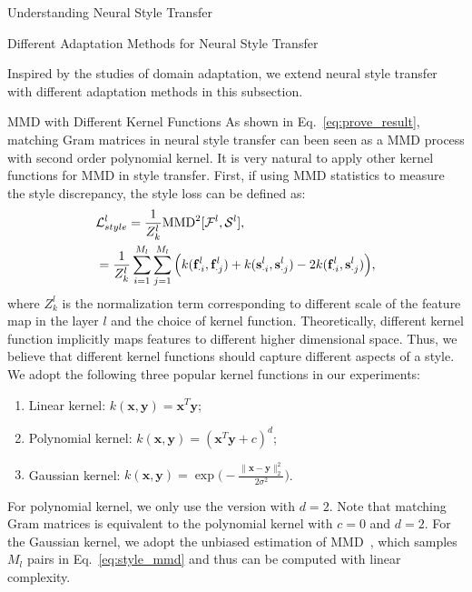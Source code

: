 \begin{section}{Understanding Neural Style Transfer}
\begin{subsection}{Different Adaptation Methods for Neural Style Transfer}

Inspired by the studies of domain adaptation, we extend neural style transfer with different adaptation methods in this subsection.

\begin{paragraph}{MMD with Different Kernel Functions}
As shown in Eq.~\ref{eq:prove_result}, matching Gram matrices in neural style transfer can been seen as a MMD process with second order polynomial kernel. It is very natural to apply other kernel functions for MMD in style transfer. First, if using MMD statistics to measure the style discrepancy, the style loss can be defined as:
\begin{equation}\label{eq:style_mmd}
\begin{aligned}
&\mathcal{L}_{style}^l = \frac{1}{Z^l_k}\text{MMD}^2[\mathcal{F}^{l}, \mathcal{S}^{l}],\\
	&= \frac{1}{Z^l_k}\sum_{i=1}^{M_l}\sum_{j=1}^{M_l}\Big( 
		k(\col{\mathbf{f}^l}{i}, \col{\mathbf{f}^l}{j}) +
		  k(\col{\mathbf{s}^l}{i}, \col{\mathbf{s}^l}{j}) - 2k(\col{\mathbf{f}^l}{i}, \col{\mathbf{s}^l}{j})
	\Big),
\end{aligned}
\end{equation}
where $Z^l_k$ is the normalization term corresponding to different scale of the feature map in the layer $l$ and the choice of  kernel function. Theoretically, different kernel function implicitly maps features to different higher dimensional space. Thus, we believe that different kernel functions should capture different aspects of a style. We adopt the following three popular kernel functions in our experiments:
\begin{enumerate}[{(1)}]
	\item Linear kernel: $k(\mathbf{x}, \mathbf{y}) = \mathbf{x}^T\mathbf{y}$;
	\item Polynomial kernel: $k(\mathbf{x}, \mathbf{y}) = (\mathbf{x}^T\mathbf{y} + c)^d$;
	\item Gaussian kernel: $k(\mathbf{x}, \mathbf{y}) = \exp\big( -\frac{\|\mathbf{x} - \mathbf{y}\|_2^2}{2\sigma^2}  \big)$.
\end{enumerate}
For polynomial kernel, we only use the version with $d = 2$. Note that matching Gram matrices is equivalent to the polynomial kernel with $c = 0$ and $d = 2$. For the Gaussian kernel, we adopt the unbiased estimation of MMD~\cite{gretton2012optimal}, which samples $M_l$ pairs in Eq.~\ref{eq:style_mmd} and thus can be computed with linear complexity. %

\end{paragraph}
\end{subsection}
\end{section}
